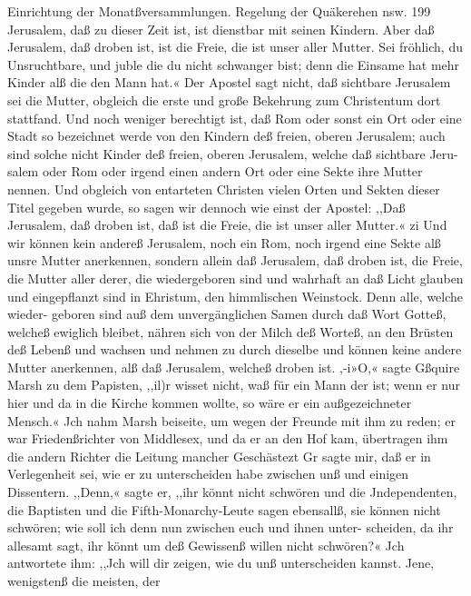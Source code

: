Einrichtung der Monatßversammlungen. Regelung der Quäkerehen nsw. 199
Jerusalem, daß zu dieser Zeit ist, ist dienstbar mit seinen Kindern.
Aber daß Jerusalem, daß droben ist, ist die Freie, die ist unser
aller Mutter. Sei fröhlich, du Unsruchtbare, und juble die du
nicht schwanger bist; denn die Einsame hat mehr Kinder alß
die den Mann hat.« Der Apostel sagt nicht, daß sichtbare
Jerusalem sei die Mutter, obgleich die erste und große Bekehrung
zum Christentum dort stattfand. Und noch weniger berechtigt ist, daß
Rom oder sonst ein Ort oder eine Stadt so bezeichnet werde von
den Kindern deß freien, oberen Jerusalem; auch sind solche nicht
Kinder deß freien, oberen Jerusalem, welche daß sichtbare Jeru-
salem oder Rom oder irgend einen andern Ort oder eine Sekte
ihre Mutter nennen. Und obgleich von entarteten Christen vielen
Orten und Sekten dieser Titel gegeben wurde, so sagen wir
dennoch wie einst der Apostel: ,,Daß Jerusalem, daß droben ist,
daß ist die Freie, die ist unser aller Mutter.« zi Und wir können
kein andereß Jerusalem, noch ein Rom, noch irgend eine Sekte
alß unsre Mutter anerkennen, sondern allein daß Jerusalem, daß
droben ist, die Freie, die Mutter aller derer, die wiedergeboren
sind und wahrhaft an daß Licht glauben und eingepflanzt sind
in Ehristum, den himmlischen Weinstock. Denn alle, welche wieder-
geboren sind auß dem unvergänglichen Samen durch daß Wort
Gotteß, welcheß ewiglich bleibet, nähren sich von der Milch deß
Worteß, an den Brüsten deß Lebenß und wachsen und nehmen
zu durch dieselbe und können keine andere Mutter anerkennen,
alß daß Jerusalem, welcheß droben ist. ,-i»O,« sagte Gßquire
Marsh zu dem Papisten, ,,il)r wisset nicht, waß für ein Mann
der ist; wenn er nur hier und da in die Kirche kommen wollte,
so wäre er ein außgezeichneter Mensch.«
Jch nahm Marsh beiseite, um wegen der Freunde mit ihm
zu reden; er war Friedenßrichter von Middlesex, und da er an den
Hof kam, übertragen ihm die andern Richter die Leitung mancher
Geschästezt Gr sagte mir, daß er in Verlegenheit sei, wie er zu
unterscheiden habe zwischen unß und einigen Dissentern. ,,Denn,«
sagte er, ,,ihr könnt nicht schwören und die Jndependenten, die
Baptisten und die Fifth-Monarchy-Leute sagen ebensallß, sie können
nicht schwören; wie soll ich denn nun zwischen euch und ihnen unter-
scheiden, da ihr allesamt sagt, ihr könnt um deß Gewissenß willen
nicht schwören?« Jch antwortete ihm: ,,Jch will dir zeigen, wie
du unß unterscheiden kannst. Jene, wenigstenß die meisten, der

